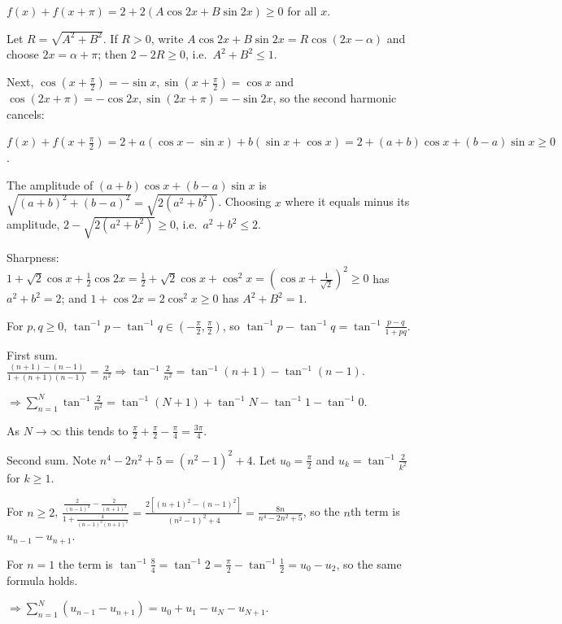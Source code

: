   $f(x) + f(x + \pi) = 2 + 2(A\cos2x + B\sin2x)\geq 0$ for all $x$.

  Let $R = \sqrt{A^2 + B^2}$. If $R > 0$, write $A\cos2x + B\sin2x = R\cos(2x - \alpha)$ and choose $2x =
  \alpha + \pi$; then $2 - 2R\geq 0$, i.e.\ $A^2 + B^2\leq 1$.

  Next, $\cos\left(x + \frac{\pi}{2}\right) = -\sin x, \sin\left(x + \frac{\pi}{2}\right) = \cos x$ and
  $\cos(2x + \pi) = -\cos2x, \sin(2x + \pi) = -\sin2x$, so the second harmonic cancels:

  $f(x) + f\left(x + \frac{\pi}{2}\right) = 2 + a(\cos x - \sin x) + b(\sin x + \cos x) = 2 + (a + b)\cos x +
  (b - a)\sin x\geq 0$.

  The amplitude of $(a + b)\cos x + (b - a)\sin x$ is $\sqrt{(a + b)^2 + (b - a)^2} = \sqrt{2(a^2 +
    b^2)}$. Choosing $x$ where it equals minus its amplitude, $2 - \sqrt{2(a^2 + b^2)}\geq 0$, i.e.\ $a^2 +
  b^2\leq 2$.

  Sharpness: $1 + \sqrt{2}\cos x + \frac{1}{2}\cos2x = \frac{1}{2} + \sqrt{2}\cos x + \cos^2x = \left(\cos x +
  \frac{1}{\sqrt{2}}\right)^2\geq 0$ has $a^2 + b^2 = 2$; and $1 + \cos2x = 2\cos^2x\geq 0$ has $A^2 + B^2 =
  1$.
\item For $p, q\geq 0$, $\tan^{-1}p - \tan^{-1}q\in\left(-\frac{\pi}{2}, \frac{\pi}{2}\right)$, so
  $\tan^{-1}p - \tan^{-1}q = \tan^{-1}\frac{p - q}{1 + pq}$.

  First sum. $\frac{(n + 1) - (n - 1)}{1 + (n + 1)(n - 1)} = \frac{2}{n^2}\Rightarrow\tan^{-1}\frac{2}{n^2}
  = \tan^{-1}(n + 1) - \tan^{-1}(n - 1)$.

  $\Rightarrow\displaystyle\sum_{n = 1}^N\tan^{-1}\frac{2}{n^2} = \tan^{-1}(N + 1) + \tan^{-1}N - \tan^{-1}1 -
  \tan^{-1}0$.

  As $N\to\infty$ this tends to $\frac{\pi}{2} + \frac{\pi}{2} - \frac{\pi}{4} = \frac{3\pi}{4}$.

  Second sum. Note $n^4 - 2n^2 + 5 = (n^2 - 1)^2 + 4$. Let $u_0 = \frac{\pi}{2}$ and $u_k =
  \tan^{-1}\frac{2}{k^2}$ for $k\geq 1$.

  For $n\geq 2$, $\frac{\frac{2}{(n - 1)^2} - \frac{2}{(n + 1)^2}}{1 + \frac{4}{(n - 1)^2(n + 1)^2}}
  = \frac{2[(n + 1)^2 - (n - 1)^2]}{(n^2 - 1)^2 + 4} = \frac{8n}{n^4 - 2n^2 + 5}$, so the $n$th term is $u_{n
    - 1} - u_{n + 1}$.

  For $n = 1$ the term is $\tan^{-1}\frac{8}{4} = \tan^{-1}2 = \frac{\pi}{2} - \tan^{-1}\frac{1}{2} = u_0 -
  u_2$, so the same formula holds.

  $\Rightarrow\displaystyle\sum_{n = 1}^N(u_{n - 1} - u_{n + 1}) = u_0 + u_1 - u_N - u_{N + 1}$.


